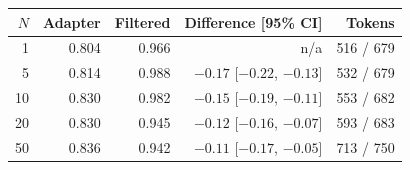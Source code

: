 \begin{tabular}{rrrrr}
\toprule
$N$ & Adapter & Filtered & Difference [95\% CI] & Tokens \\
\midrule
1 & 0.804 & 0.966 & n/a & 516 / 679 \\
5 & 0.814 & 0.988 & $-0.17$ [$-0.22$, $-0.13$] & 532 / 679 \\
10 & 0.830 & 0.982 & $-0.15$ [$-0.19$, $-0.11$] & 553 / 682 \\
20 & 0.830 & 0.945 & $-0.12$ [$-0.16$, $-0.07$] & 593 / 683 \\
50 & 0.836 & 0.942 & $-0.11$ [$-0.17$, $-0.05$] & 713 / 750 \\
\bottomrule
\end{tabular}
